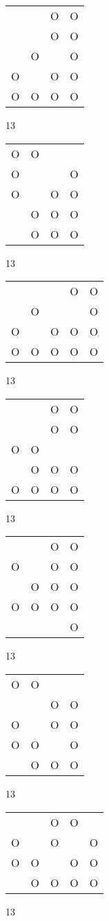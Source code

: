 \begin{tabular}{|m{0.2cm}m{0.2cm}m{0.2cm}m{0.2cm}|}\hline
 & &O&O\\
 & &O&O\\
 &O& &O\\
O& &O&O\\
O&O&O&O\\
\hline\end{tabular}13
\begin{tabular}{|m{0.2cm}m{0.2cm}m{0.2cm}m{0.2cm}|}\hline
O&O& & \\
O& & &O\\
O& &O&O\\
 &O&O&O\\
 &O&O&O\\
\hline\end{tabular}13
\begin{tabular}{|m{0.2cm}m{0.2cm}m{0.2cm}m{0.2cm}m{0.2cm}|}\hline
 & & &O&O\\
 &O& & &O\\
O& &O&O&O\\
O&O&O&O&O\\
\hline\end{tabular}13
\begin{tabular}{|m{0.2cm}m{0.2cm}m{0.2cm}m{0.2cm}|}\hline
 & &O&O\\
 & &O&O\\
O&O& & \\
 &O&O&O\\
O&O&O&O\\
\hline\end{tabular}13
\begin{tabular}{|m{0.2cm}m{0.2cm}m{0.2cm}m{0.2cm}|}\hline
 & &O&O\\
O& &O&O\\
 &O&O&O\\
O&O&O&O\\
 & & &O\\
\hline\end{tabular}13
\begin{tabular}{|m{0.2cm}m{0.2cm}m{0.2cm}m{0.2cm}|}\hline
O&O& & \\
 & &O&O\\
O& &O&O\\
O&O& &O\\
 &O&O&O\\
\hline\end{tabular}13
\begin{tabular}{|m{0.2cm}m{0.2cm}m{0.2cm}m{0.2cm}m{0.2cm}|}\hline
 & &O&O& \\
O& &O& &O\\
O&O& &O&O\\
 &O&O&O&O\\
\hline\end{tabular}13
